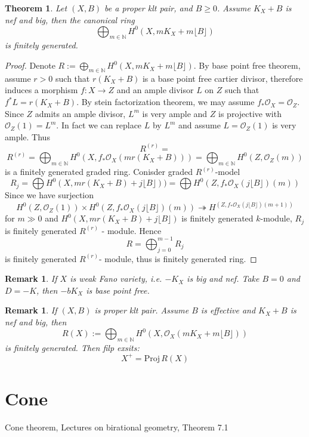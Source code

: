 \documentclass{article}
\newtheorem{thm}[defn]{Theorem}
\newtheorem{rmk}[defn]{Remark}
\begin{document}
\begin{thm}
  Let $ (X,B) $ be a proper klt pair, and $ B\geqslant 0 $. Assume $ K_X+B $ is nef and big, then the canonical ring
  \[ \bigoplus_{m\in \mathbb{N}}H^0(X,mK_X+m\lfloor B\rfloor) \]
  is finitely generated.
\end{thm}
\begin{proof}
  Denote $ R:=\bigoplus_{m\in \mathbb{N}}H^0(X,mK_X+m\lfloor B\rfloor) $. By base point free theorem, assume $ r>0 $ such that $ r(K_X+B) $ is a base point free cartier divisor, therefore induces a morphism $ f:X\to Z $ and an ample divisor $ L $ on $ Z $ such that $ f^*L=r(K_X+B) $. By stein factorization theorem, we may assume $ f_*\mathcal{O}_X=\mathcal{O}_Z $. Since $ Z $ admits an ample divisor, $ L^m $ is very ample and $ Z $ is projective with $ \mathcal{O}_Z(1)=L^m $. In fact we can replace $ L $ by $ L^m $ and assume $ L=\mathcal{O}_Z(1) $ is very ample. Thus
  \[
    R^{(r)}=
  \]
  \[ R^{(r)}=\bigoplus_{m\in \mathbb{N}}H^0(X,f_*\mathcal{O}_X(mr(K_X+B)))=\bigoplus_{m\in \mathbb{N}}H^0(Z,\mathcal{O}_Z(m)) \]
  is a finitely generated graded ring. Conisder graded $ R^{(r)} $-model
  $$ R_j=\bigoplus H^0(X, mr(K_X+B)+j\lfloor B\rfloor))=\bigoplus H^0(Z, f_*\mathcal{O}_X(j\lfloor B\rfloor)(m))$$ 
  Since we have surjection
  \[ H^0(Z,\mathcal{O}_Z(1))\times H^0(Z, f_*\mathcal{O}_X(j\lfloor B\rfloor)(m))\twoheadrightarrow H^(Z, f_*\mathcal{O}_X(j\lfloor B\rfloor)(m+1)) \]
  for $ m\gg0 $ and $ H^0(X, mr(K_X+B)+j\lfloor B\rfloor) $ is finitely generated $ k $-module, $ R_j $ is finitely generated $ R^(r) $ - module. Hence 
  \[ R=\bigoplus_{j=0}^{m-1}R_j \]
  is finitely generated $ R^{(r)} $- module, thus is finitely generated ring.
\end{proof}


\begin{rmk}
  If $ X $ is weak Fano variety, i.e. $ -K_X $ is big and nef. Take $ B=0 $ and $ D=-K $, then $ -bK_X $ is base point free. 
\end{rmk}
\begin{rmk}
  If $ (X,B) $ is proper klt pair. Assume $ B $ is effective and $ K_X+B $ is nef and big, then 
  \[ R(X):=\bigoplus_{m\in \mathbb{N}}H^0(X,\mathcal{O}_X(mK_X+m\lfloor B\rfloor)) \]
  is finitely generated. Then filp exsits:
  \[
    X^+=\mathrm{Proj}\,R(X)
  \]
\end{rmk}

\section{Cone}
 Cone theorem, Lectures on birational geometry, Theorem 7.1
\end{document}
